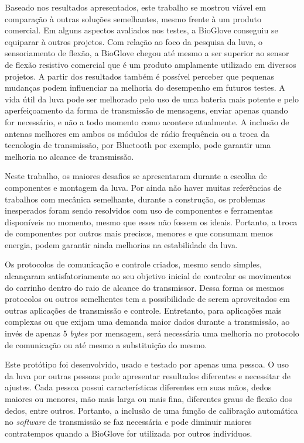 \documentclass[
	12pt,				%
	openright,			%
	oneside,			%
	a4paper,			%
	english,			%
	brazil				%
	]{abntex2}
\begin{document}
		Baseado nos resultados apresentados, este trabalho se mostrou viável em comparação à outras soluções semelhantes, mesmo frente à um produto comercial. Em alguns aspectos avaliados nos testes, a BioGlove conseguiu se equiparar à outros projetos. Com relação ao foco da pesquisa da luva, o sensoriamento de flexão, a BioGlove chegou até mesmo a ser superior ao sensor de flexão resistivo comercial que é um produto amplamente utilizado em diversos projetos. A partir dos resultados também é possível perceber que pequenas mudanças podem influenciar na melhoria do desempenho em futuros testes. A vida útil da luva pode ser melhorado pelo uso de uma bateria mais potente e pelo aperfeiçoamento da forma de transmissão de mensagens, enviar apenas quando for necessário, e não a todo momento como acontece atualmente. A inclusão de antenas melhores em ambos os módulos de rádio frequência ou a troca da tecnologia de transmissão, por Bluetooth por exemplo, pode garantir uma melhoria no alcance de transmissão.

		Neste trabalho, os maiores desafios se apresentaram durante a escolha de componentes e montagem da luva. Por ainda não haver muitas referências de trabalhos com mecânica semelhante, durante a construção, os problemas inesperados foram sendo resolvidos com uso de componentes e ferramentas disponíveis no momento, mesmo que esses não fossem os ideais. Portanto, a troca de componentes por outros mais precisos, menores e que consumam menos energia, podem garantir ainda melhorias na estabilidade da luva.

		Os protocolos de comunicação e controle criados, mesmo sendo simples, alcançaram satisfatoriamente ao seu objetivo inicial de controlar os movimentos do carrinho dentro do raio de alcance do transmissor. Dessa forma os mesmos protocolos ou outros semelhentes tem a possibilidade de serem aproveitados em outras aplicações de transmissão e controle. Entretanto, para aplicações mais complexas ou que exijam uma demanda maior dados durante a transmissão, ao invés de apenas 5 \textit{bytes} por mensagem, será necessária uma melhoria no protocolo de comunicação ou até mesmo a substituição do mesmo.

		Este protótipo foi desenvolvido, usado e testado por apenas uma pessoa. O uso da luva por outras pessoas pode apresentar resultados diferentes e necessitar de ajustes. Cada pessoa possui características diferentes em suas mãos, dedos maiores ou menores, mão mais larga ou mais fina, diferentes graus de flexão dos dedos, entre outros. Portanto, a inclusão de uma função de calibração automática no \textit{software} de transmissão se faz necessária e pode diminuir maiores contratempos quando a BioGlove for utilizada por outros indivíduos.
\end{document}
